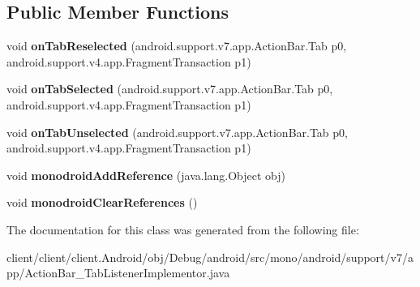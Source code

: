 \subsection*{Public Member Functions}
\begin{DoxyCompactItemize}
\item 
\hypertarget{classmono_1_1android_1_1support_1_1v7_1_1app_1_1ActionBar__TabListenerImplementor_a6b35cb09703a4c23539a8e4396b9c863}{}void {\bfseries on\+Tab\+Reselected} (android.\+support.\+v7.\+app.\+Action\+Bar.\+Tab p0, android.\+support.\+v4.\+app.\+Fragment\+Transaction p1)\label{classmono_1_1android_1_1support_1_1v7_1_1app_1_1ActionBar__TabListenerImplementor_a6b35cb09703a4c23539a8e4396b9c863}

\item 
\hypertarget{classmono_1_1android_1_1support_1_1v7_1_1app_1_1ActionBar__TabListenerImplementor_aaff79de08cbe6639362e13d59b7e4e4a}{}void {\bfseries on\+Tab\+Selected} (android.\+support.\+v7.\+app.\+Action\+Bar.\+Tab p0, android.\+support.\+v4.\+app.\+Fragment\+Transaction p1)\label{classmono_1_1android_1_1support_1_1v7_1_1app_1_1ActionBar__TabListenerImplementor_aaff79de08cbe6639362e13d59b7e4e4a}

\item 
\hypertarget{classmono_1_1android_1_1support_1_1v7_1_1app_1_1ActionBar__TabListenerImplementor_af68d830015bf6da6d2dc1ae38e124dd6}{}void {\bfseries on\+Tab\+Unselected} (android.\+support.\+v7.\+app.\+Action\+Bar.\+Tab p0, android.\+support.\+v4.\+app.\+Fragment\+Transaction p1)\label{classmono_1_1android_1_1support_1_1v7_1_1app_1_1ActionBar__TabListenerImplementor_af68d830015bf6da6d2dc1ae38e124dd6}

\item 
\hypertarget{classmono_1_1android_1_1support_1_1v7_1_1app_1_1ActionBar__TabListenerImplementor_af54da88b9fc4e1343976e6e7276ecc49}{}void {\bfseries monodroid\+Add\+Reference} (java.\+lang.\+Object obj)\label{classmono_1_1android_1_1support_1_1v7_1_1app_1_1ActionBar__TabListenerImplementor_af54da88b9fc4e1343976e6e7276ecc49}

\item 
\hypertarget{classmono_1_1android_1_1support_1_1v7_1_1app_1_1ActionBar__TabListenerImplementor_a04a2ade136155c99483da263552b02a5}{}void {\bfseries monodroid\+Clear\+References} ()\label{classmono_1_1android_1_1support_1_1v7_1_1app_1_1ActionBar__TabListenerImplementor_a04a2ade136155c99483da263552b02a5}

\end{DoxyCompactItemize}


The documentation for this class was generated from the following file\+:\begin{DoxyCompactItemize}
\item 
client/client/client.\+Android/obj/\+Debug/android/src/mono/android/support/v7/app/Action\+Bar\+\_\+\+Tab\+Listener\+Implementor.\+java\end{DoxyCompactItemize}
